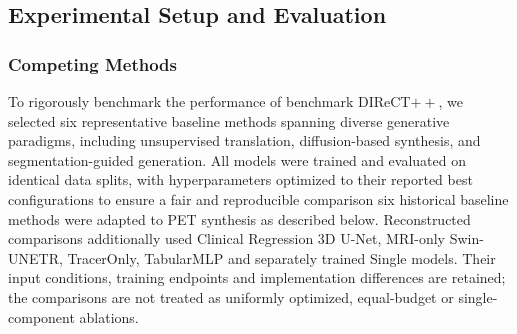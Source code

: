 \documentclass{article}
\providecommand{\DIFaddtex}[1]{{\protect\color{blue} \sf #1}} %
\providecommand{\DIFdeltex}[1]{{\protect\color{red} \scriptsize #1}} %
\providecommand{\DIFaddbegin}{} %
\providecommand{\DIFaddend}{} %
\providecommand{\DIFdelbegin}{} %
\providecommand{\DIFdelend}{} %
\providecommand{\DIFadd}[1]{\texorpdfstring{\DIFaddtex{#1}}{#1}} %
\providecommand{\DIFdel}[1]{\texorpdfstring{\DIFdeltex{#1}}{}} %
\newcommand{\DIFscaledelfig}{0.5}
\newlength{\DIFdelgraphicswidth} %
\newlength{\DIFdelgraphicsheight} %
\newcommand{\DIFaddincludegraphics}[2][]{{\color{blue}\fbox{\DIFOincludegraphics[#1]{#2}}}} %
\newcommand{\DIFdelincludegraphics}[2][]{%
\sbox{\DIFdelgraphicsbox}{\DIFOincludegraphics[#1]{#2}}%
\settoboxwidth{\DIFdelgraphicswidth}{\DIFdelgraphicsbox} %
\settoboxtotalheight{\DIFdelgraphicsheight}{\DIFdelgraphicsbox} %
\scalebox{\DIFscaledelfig}{%
\parbox[b]{\DIFdelgraphicswidth}{\usebox{\DIFdelgraphicsbox}\\[-\baselineskip] \rule{\DIFdelgraphicswidth}{0em}}\llap{\resizebox{\DIFdelgraphicswidth}{\DIFdelgraphicsheight}{%
\setlength{\unitlength}{\DIFdelgraphicswidth}%
\begin{picture}(1,1)%
\thicklines\linethickness{2pt} %
{\color[rgb]{1,0,0}\put(0,0){\framebox(1,1){}}}%
{\color[rgb]{1,0,0}\put(0,0){\line( 1,1){1}}}%
{\color[rgb]{1,0,0}\put(0,1){\line(1,-1){1}}}%
\end{picture}%
}\hspace*{3pt}}} %
} %
\DeclareRobustCommand{\DIFaddbegin}{\DIFOaddbegin \let\includegraphics\DIFaddincludegraphics} %
\DeclareRobustCommand{\DIFaddend}{\DIFOaddend \let\includegraphics\DIFOincludegraphics} %
\DeclareRobustCommand{\DIFdelbegin}{\DIFOdelbegin \let\includegraphics\DIFdelincludegraphics} %
\DeclareRobustCommand{\DIFdelend}{\DIFOaddend \let\includegraphics\DIFOincludegraphics} %
\begin{document}
\subsection{Experimental Setup and Evaluation}
\subsubsection{Competing Methods}
To \DIFdelbegin \DIFdel{rigorously benchmark the performance of }\DIFdelend \DIFaddbegin \DIFadd{benchmark }\DIFaddend DIReCT$++$, \DIFdelbegin \DIFdel{we selected six representative baseline methods spanning diverse generative paradigms, including unsupervised translation, diffusion-based synthesis, and segmentation-guided generation. All models were trained and evaluated on identical data splits, with hyperparameters optimized to their reported best configurations to ensure a fair and reproducible comparison}\DIFdelend \DIFaddbegin \DIFadd{six historical baseline methods were adapted to PET synthesis as described below. Reconstructed comparisons additionally used Clinical Regression 3D U-Net, MRI-only Swin-UNETR, TracerOnly, TabularMLP and separately trained Single models. Their input conditions, training endpoints and implementation differences are retained; the comparisons are not treated as uniformly optimized, equal-budget or single-component ablations}\DIFaddend .
\end{document}
